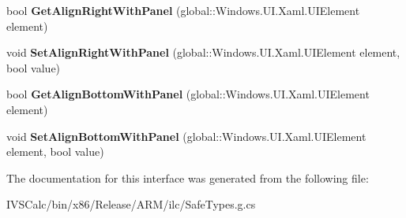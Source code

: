 \begin{DoxyCompactItemize}
bool {\bfseries Get\+Align\+Right\+With\+Panel} (global\+::\+Windows.\+U\+I.\+Xaml.\+U\+I\+Element element)
\item 
\mbox{\label{interface_windows_1_1_u_i_1_1_xaml_1_1_controls_1_1_i_relative_panel_statics_a2c4edfaf4e3bacc3f959ee0a58907e8a}} 
void {\bfseries Set\+Align\+Right\+With\+Panel} (global\+::\+Windows.\+U\+I.\+Xaml.\+U\+I\+Element element, bool value)
\item 
\mbox{\label{interface_windows_1_1_u_i_1_1_xaml_1_1_controls_1_1_i_relative_panel_statics_ae0d4717061b42365289442969aba8977}} 
bool {\bfseries Get\+Align\+Bottom\+With\+Panel} (global\+::\+Windows.\+U\+I.\+Xaml.\+U\+I\+Element element)
\item 
\mbox{\label{interface_windows_1_1_u_i_1_1_xaml_1_1_controls_1_1_i_relative_panel_statics_a0282f7f3fedefd9e7725ff429dfb714b}} 
void {\bfseries Set\+Align\+Bottom\+With\+Panel} (global\+::\+Windows.\+U\+I.\+Xaml.\+U\+I\+Element element, bool value)
\end{DoxyCompactItemize}


The documentation for this interface was generated from the following file\+:\begin{DoxyCompactItemize}
\item 
I\+V\+S\+Calc/bin/x86/\+Release/\+A\+R\+M/ilc/Safe\+Types.\+g.\+cs\end{DoxyCompactItemize}
